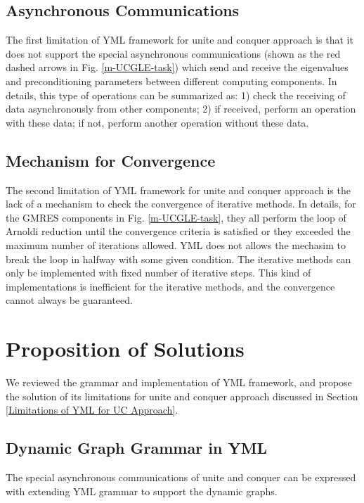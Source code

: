 \subsection{Asynchronous Communications}

The first limitation of YML framework for unite and conquer approach is that it does not support the special asynchronous communications (shown as the red dashed arrows in Fig. \ref{m-UCGLE-task}) which send and receive the eigenvalues and preconditioning parameters between different computing components. In details, this type of operations can be summarized as: 1) check the receiving of data asynchronously from other components; 2) if received, perform an operation with these data; if not, perform another operation without these data.

\subsection{Mechanism for Convergence}

The second limitation of YML framework for unite and conquer approach is the lack of a mechanism to check the convergence of iterative methods. In details, for the GMRES components in Fig. \ref{m-UCGLE-task}, they all perform the loop of Arnoldi reduction until the convergence criteria is satisfied or they exceeded the maximum number of iterations allowed. YML does not allows the mechasim to break the loop in halfway with some given condition. The iterative methods can only be implemented with fixed number of iterative steps. This kind of implementations is inefficient for the iterative methods, and the convergence cannot always be guaranteed.

\section{Proposition of Solutions}

We reviewed the grammar and implementation of YML framework, and propose the solution of its limitations for unite and conquer approach discussed in Section \ref{Limitations of YML for UC Approach}.

\subsection{Dynamic Graph Grammar in YML}

The special asynchronous communications of unite and conquer can be expressed with extending YML grammar to support the dynamic graphs.

